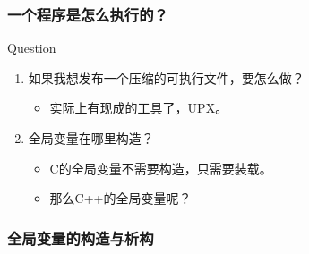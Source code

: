 \documentclass[UTF8,lualatex]{ctexbeamer}
\begin{document}
\begin{frame}
    \frametitle{一个程序是怎么执行的？}
    \begin{block}{Question}
        \begin{enumerate}
        \item<1-> 如果我想发布一个压缩的可执行文件，要怎么做？
            \begin{itemize}
            \item 实际上有现成的工具了，UPX。
            \end{itemize}
        \item<2-> 全局变量在哪里构造？
            \begin{itemize}
            \item C的全局变量不需要构造，只需要装载。
            \item 那么C++的全局变量呢？
            \end{itemize}
        \end{enumerate}
    \end{block}
\end{frame}

\begin{frame}[fragile]
    \frametitle{全局变量的构造与析构}
    \scriptsize
    \begin{block}{~}
    \end{block}
\end{frame}
\end{document}
